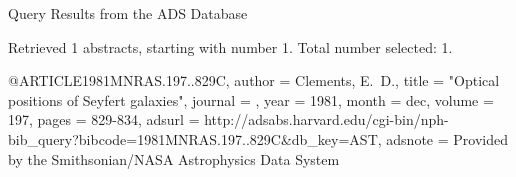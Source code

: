 Query Results from the ADS Database


Retrieved 1 abstracts, starting with number 1.  Total number selected: 1.

@ARTICLE{1981MNRAS.197..829C,
   author = {{Clements}, E.~D.},
    title = "{Optical positions of Seyfert galaxies}",
  journal = {\mnras},
     year = 1981,
    month = dec,
   volume = 197,
    pages = {829-834},
   adsurl = {http://adsabs.harvard.edu/cgi-bin/nph-bib_query?bibcode=1981MNRAS.197..829C&db_key=AST},
  adsnote = {Provided by the Smithsonian/NASA Astrophysics Data System}
}


